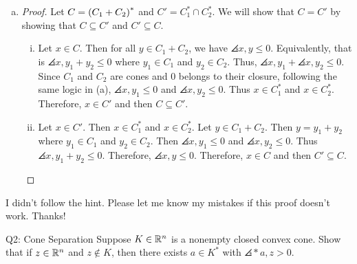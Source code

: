 \documentclass{article}
\begin{document}
\begin{solution}
\begin{enumerate}[(a)]
{\begin{proof}
\begin{enumerate}[(i)]
{                    }
                    \item {
                        Let $x\in C'$. Then $x\in C_i^*$ for all $i\in I$. Let $y\in \cup_{i\in I}C_i$. Then $y_i\in C_i$ for $i\in I$. Then $\angles{x,y_i}\leq 0$. Thus $\angles{x,y}\leq 0$. Therefore, $x\in C$ and then $C'\subseteq C$.
                    }
                \end{enumerate}
            \end{proof}
        }
        \item {
            \begin{proof}
                Let $C=\parens*{C_1+C_2}^*$ and $C'=C_1^*\cap C_2^*$. We will show that $C=C'$ by showing that $C\subseteq C'$ and $C'\subseteq C$.
                \begin{enumerate}[(i)]
                    \item {
                        Let $x\in C$. Then for all $y\in C_1+C_2$, we have $\angles{x,y}\leq 0$. Equivalently, that is $\angles{x,y_1+y_2}\leq0$ where $y_1\in C_1$ and $y_2\in C_2$. Thus, $\angles{x,y_1}+\angles{x,y_2}\leq 0$. Since $C_1$ and $C_2$ are cones and $0$ belongs to their closure, following the same logic in (a), $\angles{x,y_1}\leq 0$ and $\angles{x,y_2}\leq 0$. Thus $x\in C_1^*$ and $x\in C_2^*$. Therefore, $x\in C'$ and then $C\subseteq C'$.
                    }
                    \item {
                        Let $x\in C'$. Then $x\in C_1^*$ and $x\in C_2^*$. Let $y\in C_1+C_2$. Then $y=y_1+y_2$ where $y_1\in C_1$ and $y_2\in C_2$. Then $\angles{x,y_1}\leq 0$ and $\angles{x,y_2}\leq 0$. Thus $\angles{x,y_1+y_2}\leq 0$. Therefore, $\angles{x,y}\leq 0$. Therefore, $x\in C$ and then $C'\subseteq C$.
                    }
                \end{enumerate}
            \end{proof}
        }
    \end{enumerate}
    I didn't follow the hint. Please let me know my mistakes if this proof doesn't work. Thanks!
\end{solution}

\begin{problem}
    {Q2: Cone Separation}
    Suppose $K\in\R^n$ is a nonempty closed convex cone. Show that if $z\in \R^n$ and $z\notin K$, then there exists $a\in K^*$ with $\angles*{a,z}>0$.
\end{problem}
\end{document}
